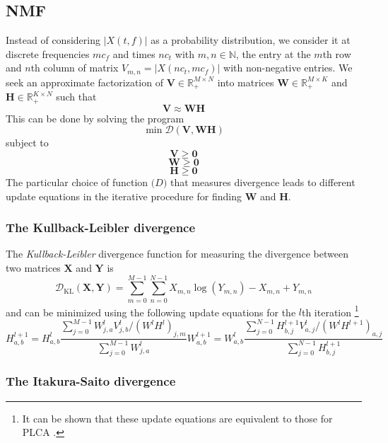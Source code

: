 \subsection{NMF}

Instead of considering $|X(t,f)|$ as a probability distribution, we
consider it at discrete frequencies $mc_{f}$ and times $nc_{t}$ with $m,n \in
\mathbb{N}$, the entry at the $m$th row and $n$th column of matrix
$V_{m,n}=|X(nc_{t},mc_{f})|$ with non-negative entries. We seek an
approximate factorization of $\boldsymbol{V} \in \mathbb{R}^{M \times N}_{+}$
into matrices $\boldsymbol{W} \in \mathbb{R}^{M \times K}_{+}$ and
$\boldsymbol{H} \in \mathbb{R}^{K \times N}_{+}$ such that
\begin{equation}
    \boldsymbol{V} \approx \boldsymbol{W}\boldsymbol{H}
    \label{eq:VaprxWH}
\end{equation}
This can be done by solving the program
\[
    \min \mathcal{D}(\boldsymbol{V},\boldsymbol{W}\boldsymbol{H})
\]
subject to
\[
    \boldsymbol{V} \geq \boldsymbol{0}
\]
\[
    \boldsymbol{W} \geq \boldsymbol{0}
\]
\[
    \boldsymbol{H} \geq \boldsymbol{0}
\]
The particular choice of function $\mathcal(D)$ that measures divergence leads
to different update equations in the iterative procedure for finding
$\boldsymbol{W}$ and $\boldsymbol{H}$.

\subsubsection{The Kullback-Leibler divergence \cite{lee2001algorithms}}

The \textit{Kullback-Leibler} divergence function for measuring the divergence
between two matrices $\boldsymbol{X}$ and $\boldsymbol{Y}$ is
\[
    \mathcal{D}_{\text{KL}}(\boldsymbol{X},\boldsymbol{Y}) =
    \sum_{m=0}^{M-1}\sum_{n=0}^{N-1} X_{m,n}\log(Y_{m,n})-X_{m,n}+Y_{m,n}
\]
and can be minimized using the following update equations for the $l$th iteration%
\footnote{It can be shown that these update equations are equivalent to those for PLCA 
\cite{shashanka2008probabilistic}.}
\[
    H_{a,b}^{l+1} =
    H_{a,b}^{l} \frac{\sum_{j=0}^{M-1}W_{j,a}^{l}V_{j,b}^{l} / (W^{l}H^{l})_{j,m}}
    {\sum_{j=0}^{M-1}W_{j,a}^{l}}
    W_{a,b}^{l+1} =
    W_{a,b}^{l} \frac{\sum_{j=0}^{N-1}H_{b,j}^{l+1}V_{a,j}^{l} / (W^{l}H^{l+1})_{a,j}}
    {\sum_{j=0}^{N-1}H_{b,j}^{l+1}}
\]

\subsubsection{The Itakura-Saito divergence \cite{fevotte2009nonnegative}}

